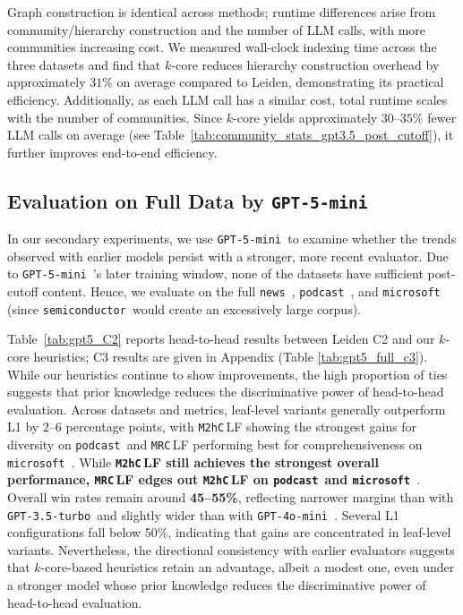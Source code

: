 \documentclass[sigconf]{acmart}
\newcommand{\MHC}{\texttt{M2hC}\,}
\newcommand{\MRC}{\texttt{MRC}\,}
\newcommand{\threepointfive}{\texttt{GPT-3.5-turbo\,}}
\newcommand{\four}{\texttt{GPT-4o-mini\,}}
\newcommand{\five}{\texttt{GPT-5-mini\,}}
\newcommand{\podcast}{\texttt{podcast\,}}
\newcommand{\news}{\texttt{news\,}}
\newcommand{\semi}{\texttt{semiconductor\,}}
\newcommand{\ms}{\texttt{microsoft\,}}
\begin{document}
Graph construction is identical across methods; runtime differences arise from community/hierarchy construction and the number of LLM calls, with more communities increasing cost. We measured wall-clock indexing time across the three datasets and find that $k$-core reduces hierarchy construction overhead by approximately $31\%$ on average compared to Leiden, demonstrating its practical efficiency. Additionally, as each LLM call has a similar cost, total runtime scales with the number of communities. Since $k$-core yields approximately $30$--$35\%$ fewer LLM calls on average (see Table~\ref{tab:community_stats_gpt3.5_post_cutoff}), it further improves end-to-end efficiency.

\subsection{Evaluation on Full Data by \five}\label{subsec:sec}

In our secondary experiments, we use \five to examine whether the trends observed with earlier models persist with a stronger, more recent evaluator. 
Due to \five’s later training window, none of the datasets have sufficient post-cutoff content. 
Hence, we evaluate on the full \news, \podcast, and \ms (since \semi would create an excessively large corpus).

Table~\ref{tab:gpt5_C2} reports head-to-head results between Leiden C2 and our $k$-core heuristics;  C3 results are given in %
Appendix  (Table \ref{tab:gpt5_full_c3}).
While our heuristics continue to show improvements, the high proportion of ties suggests that prior knowledge reduces the discriminative power of head-to-head evaluation.
Across datasets and metrics, leaf-level variants generally outperform L1 by {2--6} percentage points, with \MHC LF showing the strongest gains for diversity on \podcast and \MRC LF performing best for comprehensiveness on \ms.
While {\bf \MHC LF still achieves the strongest overall performance, \MRC LF
edges out \MHC LF on \podcast and \ms}.
Overall win rates remain around \textbf{45--55\%}, reflecting narrower margins
than with \threepointfive and slightly wider than with \four.
Several L1 configurations fall below 50\%, indicating that gains
are concentrated in leaf-level variants. Nevertheless, the directional consistency
with earlier evaluators suggests that $k$-core-based heuristics retain an
advantage, albeit a modest one, even under a stronger model whose prior knowledge
reduces the discriminative power of head-to-head evaluation.
\end{document}
